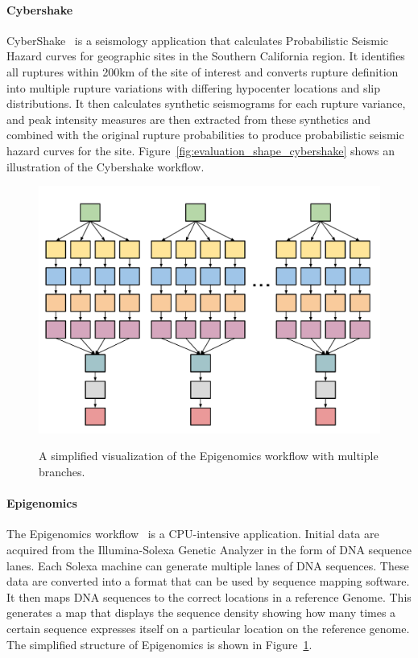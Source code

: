 \documentclass{IOS-Book-Article}
\begin{document}
\paragraph{\textbf{Cybershake}}
CyberShake~\cite{Graves2010} is a seismology application that calculates Probabilistic Seismic Hazard curves for geographic sites in the Southern California region. It identifies all ruptures within 200km of the site of interest and converts rupture definition into multiple rupture variations with differing hypocenter locations and slip distributions. It then calculates synthetic seismograms for each rupture variance, and peak intensity measures are then extracted from these synthetics and combined with the original rupture probabilities to produce probabilistic seismic hazard curves for the site. Figure~\ref{fig:evaluation_shape_cybershake} shows an illustration of the Cybershake workflow.

\begin{figure}[htb]
	\centering
	\includegraphics[width=0.8\linewidth]{genome_shape.pdf} \\
	\caption{A simplified visualization of the Epigenomics workflow with multiple branches.}
	\label{fig:evaluation_shape_genome}
\end{figure}

\paragraph{\textbf{Epigenomics}}
The Epigenomics workflow~\cite{Epigenome} is a CPU-intensive application. Initial data are acquired from the Illumina-Solexa Genetic Analyzer in the form of DNA sequence lanes. Each Solexa machine can generate multiple lanes of DNA sequences. These data are converted into a format that can be used by sequence mapping software.
It then maps DNA sequences to the correct locations in a reference Genome. This generates a map that displays the sequence density showing how many times a certain sequence expresses itself on a particular location on the reference genome. The simplified structure of Epigenomics is shown in Figure~\ref{fig:evaluation_shape_genome}. 
\end{document}
